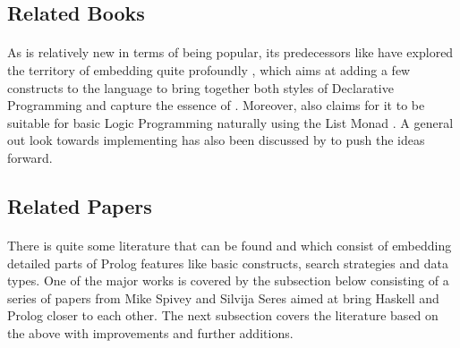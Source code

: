 \documentclass[proposal.tex]{subfiles}
\begin{document}
\subsection{Related Books}

\paragraph{} 
As  is relatively new in terms of being popular, its predecessors like  have 
explored the territory of embedding  quite profoundly \cite{friedman05reasoned}, which aims at adding a few 
constructs to the language to bring together both styles of Declarative Programming and capture the essence of 
. Moreover,  also claims for it to be suitable for basic Logic Programming 
naturally using the List Monad \cite{website:logicprogexamplehaskell}. A general out look towards implementing 
 has also been discussed by \cite{krishnamurthi2007programming} to push the ideas forward.            

\begin{comment}
All the more \textit{Prologish} things exist in Haskell, as mentioned alone it is not the only one if we consider it in the ''Scheme'' \cite{friedman05reasoned} of things and so is replication to other languages \cite{krishnamurthi2007programming}.   
\end{comment}

\begin{comment}
\begin{enumerate}
\item The Reasoned Schemer, Daniel P. Friedman, William E. Byrd, Oleg Kiselyov

\item Programming Languages: Application and Interpretation, Shriram Krishnamurthi,
\\*  Chapters 33-34 of PLAI discuss Prolog and implementing Prolog

\end{enumerate}
\end{comment}

\subsection{Related Papers}

\paragraph{} 
There is quite some literature that can be found and which consist of embedding detailed parts of Prolog features 
like basic constructs, search strategies and data types. One of the major works is covered by the subsection below 
consisting of a series of papers from Mike Spivey and Silvija Seres aimed at bring Haskell and Prolog closer to each 
other. The next subsection covers the literature based on the above with improvements and further additions. 
\end{document}
